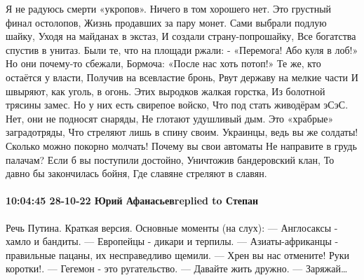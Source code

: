 Я не радуюсь смерти «укропов».
Ничего в том хорошего нет.
Это грустный финал остолопов,
Жизнь продавших за пару монет.
Сами выбрали подлую шайку,
Уходя на майданах в экстаз,
И создали страну-попрошайку,
Все богатства спустив в унитаз.
Были те, что на площади ржали:
- «Перемога! Або куля в лоб!»
Но они почему-то сбежали,
Бормоча: «После нас хоть потоп!»
Те же, кто остаётся у власти,
Получив на всевластие бронь,
Рвут державу на мелкие части
И швыряют, как уголь, в огонь.
Этих выродков жалкая горстка,
Из болотной трясины замес.
Но у них есть свирепое войско,
Что под стать живодёрам эСэС.
Нет, они не подносят снаряды,
Не глотают удушливый дым.
Это «храбрые» заградотряды,
Что стреляют лишь в спину своим.
Украинцы, ведь вы же солдаты!
Сколько можно покорно молчать!
Почему вы свои автоматы
Не направите в грудь палачам?
Если б вы поступили достойно,
Уничтожив бандеровский клан,
То давно бы закончилась бойня,
Где славяне стреляют в славян.

\paragraph{10:04:45 28-10-22 Юрий Афанасьевreplied to Степан}

Речь Путина. Краткая версия.
Основные моменты (на слух):
— Англосаксы - хамло и бандиты.
— Европейцы - дикари и терпилы.
— Азиаты-африканцы - правильные пацаны, их несправедливо щемили.
— Хрен вы нас отмените! Руки коротки!.
— Гегемон - это ругательство.
— Давайте жить дружно.
— Заряжай…

